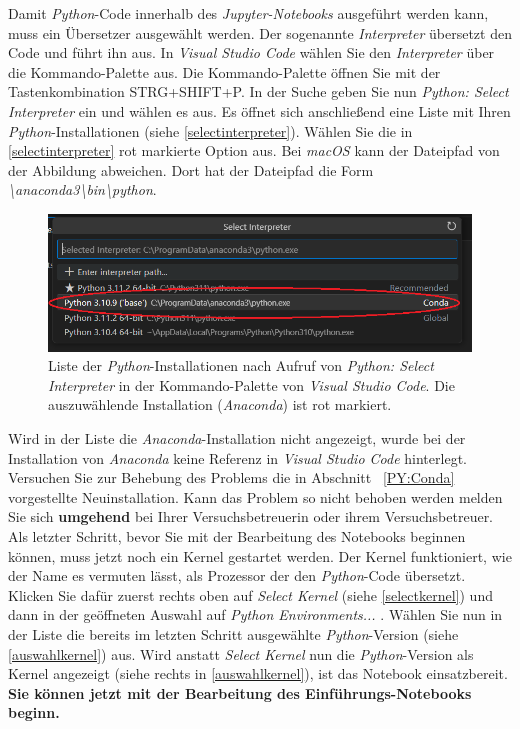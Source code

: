 \documentclass[12pt]{scrbook}
\begin{document}
Damit \textit{Python}-Code innerhalb des \textit{Jupyter-Notebooks} ausgeführt werden kann, muss ein Übersetzer ausgewählt werden. Der sogenannte \textit{Interpreter} übersetzt den Code und führt ihn aus. In \textit{Visual Studio Code} wählen Sie den \textit{Interpreter} über die Kommando-Palette aus. Die Kommando-Palette öffnen Sie mit der Tastenkombination STRG+SHIFT+P. In der Suche geben Sie nun \textit{Python: Select Interpreter} ein und wählen es aus. Es öffnet sich anschließend eine Liste mit Ihren \textit{Python}-Installationen (siehe \autoref{selectinterpreter}). Wählen Sie die in \autoref{selectinterpreter} rot markierte Option aus. Bei \textit{macOS} kann der Dateipfad von der Abbildung abweichen. Dort hat der Dateipfad die Form \textit{\textbackslash anaconda3\textbackslash bin\textbackslash python}.

\begin{figure}[ht]
\center
\includegraphics[scale=0.7]{Select Interpreter.png}
\caption{Liste der \textit{Python}-Installationen nach Aufruf von \textit{Python: Select Interpreter} in der Kommando-Palette von \textit{Visual Studio Code}. Die auszuwählende Installation (\textit{Anaconda}) ist rot markiert.}
\label{selectinterpreter}
\end{figure}

Wird in der Liste die \textit{Anaconda}-Installation nicht angezeigt, wurde bei der Installation von \textit{Anaconda} keine Referenz in \textit{Visual Studio Code} hinterlegt. Versuchen Sie zur Behebung des Problems die in Abschnitt ~\ref{PY:Conda} vorgestellte Neuinstallation. Kann das Problem so nicht behoben werden melden Sie sich \textbf{umgehend} bei Ihrer Versuchsbetreuerin oder ihrem Versuchsbetreuer.\\
\newline
Als letzter Schritt, bevor Sie mit der Bearbeitung des Notebooks beginnen können, muss jetzt noch ein Kernel gestartet werden. Der Kernel funktioniert, wie der Name es vermuten lässt, als Prozessor der den \textit{Python}-Code übersetzt. Klicken Sie dafür zuerst rechts oben auf \textit{Select Kernel} (siehe \autoref{selectkernel}) und dann in der geöffneten Auswahl auf \textit{Python Environments...} . Wählen Sie nun in der Liste die bereits im letzten Schritt ausgewählte \textit{Python}-Version (siehe \autoref{auswahlkernel}) aus. Wird anstatt \textit{Select Kernel} nun die \textit{Python}-Version als Kernel angezeigt (siehe rechts in \autoref{auswahlkernel}), ist das Notebook einsatzbereit. \textbf{Sie können jetzt mit der Bearbeitung des Einführungs-Notebooks beginn.} \\
\newline
\end{document}
